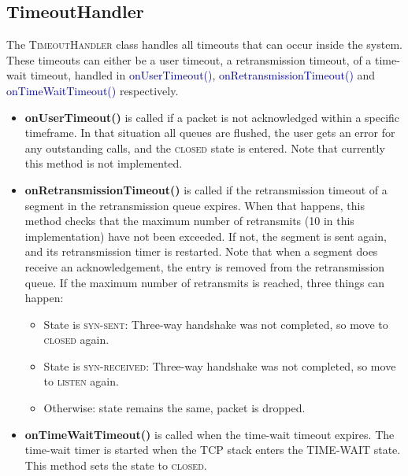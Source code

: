 \documentclass{hitec}
\newcommand{\classname}[1]{\textsc{#1}}
\newcommand{\methodname}[1]{\textcolor{darkblue}{#1}}
\newcommand{\state}[1]{\textsc{#1}}
\begin{document}
\subsection{TimeoutHandler}
The \classname{TimeoutHandler} class handles all timeouts that can occur inside the system. These timeouts can either be a user timeout, a retransmission timeout, of a time-wait timeout, handled in \methodname{onUserTimeout()}, \methodname{onRetransmissionTimeout()} and \methodname{onTimeWaitTimeout()} respectively.

\begin{itemize}
 \item \textbf{onUserTimeout()} is called if a packet is not acknowledged within a specific timeframe. In that situation all queues are flushed, the user gets an error for any outstanding calls, and the \state{closed} state is entered. Note that currently this method is not implemented.
 
 \item \textbf{onRetransmissionTimeout()} is called if the retransmission timeout of a segment in the retransmission queue expires. When that happens, this method checks that the maximum number of retransmits (10 in this implementation) have not been exceeded. If not, the segment is sent again, and its retransmission timer is restarted. Note that when a segment does receive an acknowledgement, the entry is removed from the retransmission queue. If the maximum number of retransmits is reached, three things can happen:
 
  \begin{itemize}
    \item State is \state{syn-sent}: Three-way handshake was not completed, so move to \state{closed} again.
    \item State is \state{syn-received}: Three-way handshake was not completed, so move to \state{listen} again.
    \item Otherwise: state remains the same, packet is dropped.
  \end{itemize}
 
\item \textbf{onTimeWaitTimeout()} is called when the time-wait timeout expires. The time-wait timer is started when the TCP stack enters the \state{TIME-WAIT} state. This method sets the state to \state{closed}.

\end{itemize}
\end{document}
